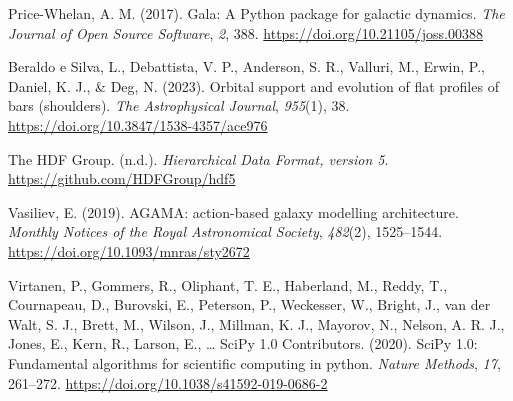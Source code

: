 \documentclass[12pt]{article}
\newlength{\cslhangindent}
\newenvironment{CSLReferences}[2] %
 {\begin{list}{}{%
  \setlength{\itemindent}{0pt}
  \setlength{\leftmargin}{0pt}
  \setlength{\parsep}{0pt}
  \ifodd #1
   \setlength{\leftmargin}{\cslhangindent}
   \setlength{\itemindent}{-1\cslhangindent}
  \fi
  \setlength{\itemsep}{#2\baselineskip}}}
 {\end{list}}
\begin{document}
\begin{CSLReferences}{1}{0}
Price-Whelan, A. M. (2017). {Gala: A Python package for galactic
dynamics}. \emph{The Journal of Open Source Software}, \emph{2}, 388.
\url{https://doi.org/10.21105/joss.00388}

Beraldo e Silva, L., Debattista, V. P., Anderson, S. R., Valluri, M., Erwin,
P., Daniel, K. J., \& Deg, N. (2023). Orbital support and evolution of
flat profiles of bars (shoulders). \emph{The Astrophysical Journal},
\emph{955}(1), 38. \url{https://doi.org/10.3847/1538-4357/ace976}

The HDF Group. (n.d.). \emph{{Hierarchical Data Format, version 5}}.
\url{https://github.com/HDFGroup/hdf5}

Vasiliev, E. (2019). {AGAMA: action-based galaxy modelling
architecture}. \emph{Monthly Notices of the Royal Astronomical Society},
\emph{482}(2), 1525--1544. \url{https://doi.org/10.1093/mnras/sty2672}

Virtanen, P., Gommers, R., Oliphant, T. E., Haberland, M., Reddy, T.,
Cournapeau, D., Burovski, E., Peterson, P., Weckesser, W., Bright, J.,
van der Walt, S. J., Brett, M., Wilson, J., Millman, K. J., Mayorov, N.,
Nelson, A. R. J., Jones, E., Kern, R., Larson, E., \ldots{} SciPy 1.0
Contributors. (2020). {SciPy} 1.0: Fundamental algorithms for scientific
computing in python. \emph{Nature Methods}, \emph{17}, 261--272.
\url{https://doi.org/10.1038/s41592-019-0686-2}

\end{CSLReferences}
\end{document}
